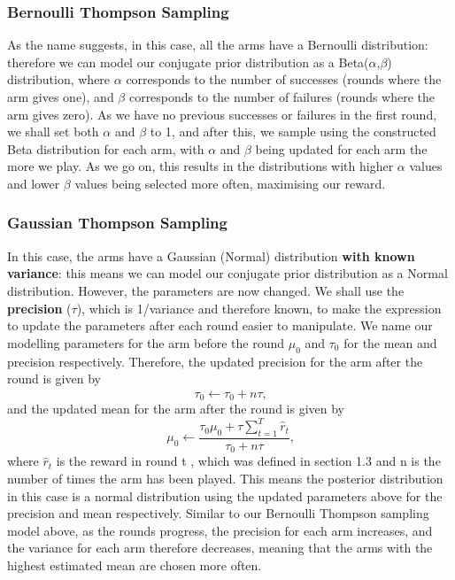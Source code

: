     \subsubsection{Bernoulli Thompson Sampling}
    As the name suggests, in this case, all the arms have a Bernoulli distribution: therefore we can model our conjugate prior distribution as a Beta($\alpha$,$\beta$) distribution, where $\alpha$ corresponds to the number of successes (rounds where the arm gives one), and $\beta$ corresponds to the number of failures (rounds where the arm gives zero). As we have no previous successes or failures in the first round, we shall set both $\alpha$ and $\beta$ to 1, and after this, we sample using the constructed Beta distribution for each arm, with $\alpha$ and $\beta$ being updated for each arm the more we play. As we go on, this results in the distributions with higher $\alpha$ values and lower $\beta$ values being selected more often, maximising our reward.

    \subsubsection{Gaussian Thompson Sampling}
    In this case, the arms have a Gaussian (Normal) distribution \textbf{with known variance}: this means we can model our conjugate prior distribution as a Normal distribution.
    However, the parameters are now changed.
    We shall use the \textbf{precision} ($\tau$), which is 1/variance and therefore known, to make the expression to update the parameters after each round easier to manipulate.
    We name our modelling parameters for the arm before the round $\mu_0$ and $\tau_0$ for the mean and precision respectively.
    Therefore, the updated precision for the arm after the round is given by
    \[\tau_0\xleftarrow{}\tau_0 + n\tau\text{,}\]
    and the updated mean for the arm after the round is given by
    \[\mu_0\xleftarrow{}\frac{\tau_0\mu_0 + \tau\sum_{t=1}^T\widehat{r}_t}{\tau_0 + n\tau}\text{,}\]
    where $\widehat{r}_t$ is the reward in round t \citep{agrawal2013further}, which was defined in section 1.3 and n is the number of times the arm has been played. This means the posterior distribution in this case is a normal distribution using the updated parameters above for the precision and mean respectively.
    Similar to our Bernoulli Thompson sampling model above, as the rounds progress, the precision for each arm increases, and the variance for each arm therefore decreases, meaning that the arms with the highest estimated mean are chosen more often.

